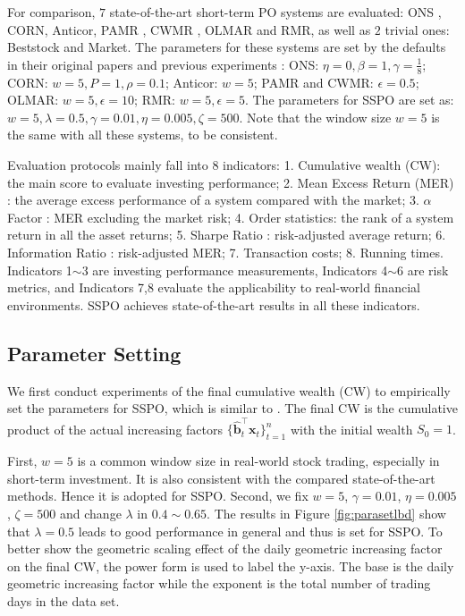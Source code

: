 \documentclass[twoside,11pt]{article}
\begin{document}
For comparison, $7$ state-of-the-art short-term PO systems are evaluated: ONS \citep{ONS}, CORN, Anticor, PAMR \citep{PAMR}, CWMR \citep{CWMR}, OLMAR and RMR, as well as $2$ trivial ones: Beststock and Market. The parameters for these systems are set by the defaults in their original papers and previous experiments \citep{olpssurvey,olpsjmlr,OLMAR,RMR2}: ONS: $\eta=0,\beta=1,\gamma=\frac{1}{8}$; CORN: $w = 5, P = 1, \rho = 0.1$; Anticor: $w=5$; PAMR and CWMR: $\epsilon=0.5$; OLMAR: $w=5, \epsilon=10$; RMR: $w=5,\epsilon=5$. The parameters for SSPO are set as: $w=5, \lambda=0.5, \gamma=0.01, \eta=0.005, \zeta=500$. Note that the window size $w=5$ is the same with all these systems, to be consistent.



Evaluation protocols mainly fall into $8$ indicators: 1. Cumulative wealth (CW): the main score to evaluate investing performance; 2. Mean Excess Return (MER) \citep{MR1}: the average excess performance of a system compared with the market; 3. $\alpha$ Factor \citep{portalpha0}: MER excluding the market risk; 4. Order statistics: the rank of a system return in all the asset returns; 5. Sharpe Ratio \citep{SHARPratio}: risk-adjusted average return; 6. Information Ratio \citep{inforatio2}: risk-adjusted MER; 7. Transaction costs; 8. Running times. Indicators 1$\sim$3 are investing performance measurements, Indicators 4$\sim$6 are risk metrics, and Indicators 7,8 evaluate the applicability to real-world financial environments. SSPO achieves state-of-the-art results in all these indicators.


\subsection{Parameter Setting}
\label{sec:paraset}
We first conduct experiments of the final cumulative wealth (CW) to empirically set the parameters for SSPO, which is similar to \citet{anticor,CORN,OLMAR,RMR,RMR2}. The final CW is the cumulative product of the actual increasing factors $\{\hat{\mathbf{b}}_{t}^\top\mathbf{x}_t\}_{t=1}^n$ with the initial wealth $S_0=1$. 

First, $w=5$ is a common window size in real-world stock trading, especially in short-term investment. It is also consistent with the compared state-of-the-art methods. Hence it is adopted for SSPO. Second, we fix $w=5$, $\gamma=0.01$, $\eta=0.005$, $\zeta=500$ and change $\lambda$ in $0.4\sim 0.65$. The results in Figure \ref{fig:parasetlbd} show that $\lambda=0.5$ leads to good performance in general and thus is set for SSPO. To better show the geometric scaling effect of the daily geometric increasing factor on the final CW, the power form is used to label the y-axis. The base is the daily geometric increasing factor while the exponent is the total number of trading days in the data set.
\end{document}
